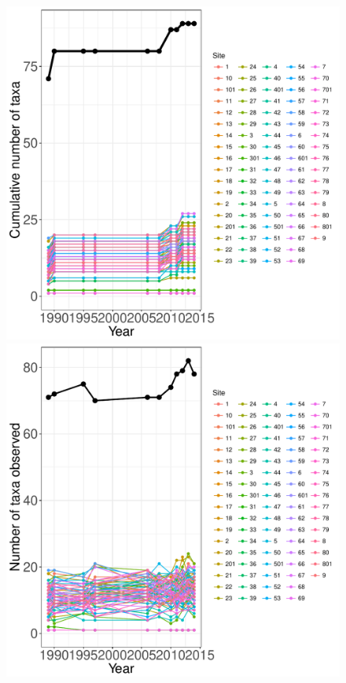 \documentclass[11pt, oneside]{article}
\begin{document}
\begin{figure}[h!]
\centering
\includegraphics[scale = 0.4]{nwt-plants-hallett_species_accumulation_curve.pdf}
\includegraphics[scale = 0.4]{nwt-plants-hallett_num_taxa_over_time.pdf}

\end{figure}
\end{document}
